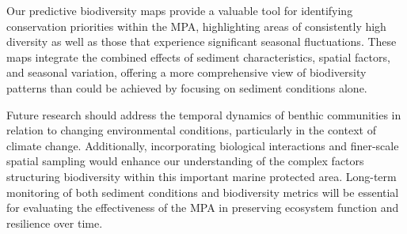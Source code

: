 \documentclass[12pt]{article}
\begin{document}
\qquad Our predictive biodiversity maps provide a valuable tool for identifying conservation priorities within the MPA, highlighting areas of consistently high diversity as well as those that experience significant seasonal fluctuations. These maps integrate the combined effects of sediment characteristics, spatial factors, and seasonal variation, offering a more comprehensive view of biodiversity patterns than could be achieved by focusing on sediment conditions alone.

\qquad Future research should address the temporal dynamics of benthic communities in relation to changing environmental conditions, particularly in the context of climate change. Additionally, incorporating biological interactions and finer-scale spatial sampling would enhance our understanding of the complex factors structuring biodiversity within this important marine protected area. Long-term monitoring of both sediment conditions and biodiversity metrics will be essential for evaluating the effectiveness of the MPA in preserving ecosystem function and resilience over time.



\newpage






\end{document}
